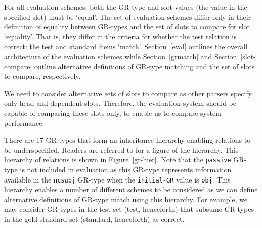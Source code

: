 \documentclass[10pt]{article}
\newcommand{\stt}[1]{{\small\texttt{#1}}}
\begin{document}
For all evaluation schemes, both the GR-type and slot values 
(the value in the specified slot) must be `equal'.
The set of evaluation schemes differ only in their definition
of equality between GR-types and the set of slots to compare
for slot `equality'. That is, they differ in the criteria 
for whether the test relation is correct: 
the test and standard items `match'. 
Section~\ref{eval} outlines
the overall architecture of the evaluation schemes while
Section~\ref{grmatch} and Section~\ref{slot-compare}
outline alternative definitions of GR-type matching and the
set of slots to compare, respectively.

We need to consider alternative sets of slots to compare as
other parsers specify only head and dependent slots. Therefore, the
evaluation system should be capable of comparing these slots only, 
to enable us to compare system performance.

There are 17 GR-types that form an inheritance 
hierarchy enabling relations to be underspecified.
Readers are referred to \cite{briscoe05a} for
a figure of the hierarchy.
This hierarchy of relations %
is shown in Figure~\ref{gr-hier}. Note that the \stt{passive} GR-type
is not included in evaluation as this GR-type represents
information available in the \stt{ncsubj} GR-type when the
\stt{initial-GR} value is \stt{obj}.
This hierarchy enables a number of different schemes to be considered
as we can define alternative definitions of GR-type match using
this hierarchy. 
For example, we may consider GR-types in the test set (test, henceforth) 
that subsume GR-types in the gold standard set (standard, henceforth) 
as correct.
\end{document}

